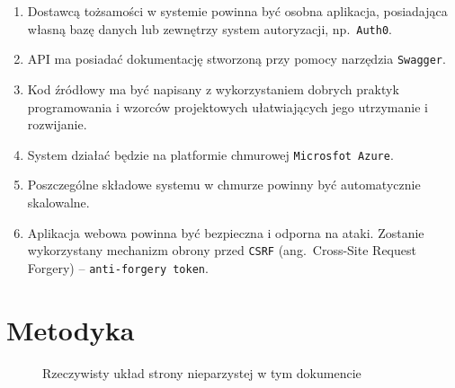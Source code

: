 \begin{enumerate}[labelwidth=\widthof{\ref{last-item}},label=\arabic*.]
\item Dostawcą tożsamości w systemie powinna być osobna aplikacja, posiadająca własną bazę danych lub zewnętrzy system autoryzacji, np.~\texttt{Auth0}.

\item API ma posiadać dokumentację stworzoną przy pomocy narzędzia \texttt{Swagger}.

\item Kod źródłowy ma być napisany z wykorzystaniem dobrych praktyk programowania i wzorców projektowych ułatwiających jego utrzymanie i rozwijanie.

\item System działać będzie na platformie chmurowej \texttt{Microsfot Azure}.

\item Poszczególne składowe systemu w chmurze powinny być automatycznie skalowalne.

\item Aplikacja webowa powinna być bezpieczna i odporna na ataki. Zostanie wykorzystany mechanizm obrony przed \texttt{CSRF} (ang.~Cross-Site Request Forgery) -- \texttt{anti-forgery token}.

\end{enumerate}

\section{Metodyka}
\label{sec:metodyka}













\begin{figure}[b]
\currentstock
\oddpagelayouttrue
\twocolumnlayoutfalse
\drawmarginparstrue
\drawparametersfalse
\drawstock
\caption{Rzeczywisty układ strony nieparzystej w tym dokumencie} \label{fig:currentPageLayout}
\end{figure}







